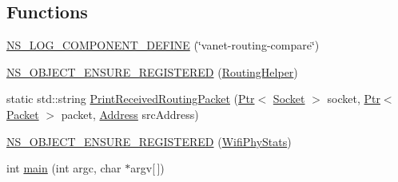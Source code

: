 \subsection*{Functions}
\begin{DoxyCompactItemize}
\item 
\hyperlink{vanet-routing-compare_8cc_a331e56b555a0c205f8ec88c30d22e6f0}{N\+S\+\_\+\+L\+O\+G\+\_\+\+C\+O\+M\+P\+O\+N\+E\+N\+T\+\_\+\+D\+E\+F\+I\+NE} (\char`\"{}vanet-\/routing-\/compare\char`\"{})
\item 
\hyperlink{vanet-routing-compare_8cc_adccadd8d23d7d66d9500068ee1af83c2}{N\+S\+\_\+\+O\+B\+J\+E\+C\+T\+\_\+\+E\+N\+S\+U\+R\+E\+\_\+\+R\+E\+G\+I\+S\+T\+E\+R\+ED} (\hyperlink{classRoutingHelper}{Routing\+Helper})
\item 
static std\+::string \hyperlink{vanet-routing-compare_8cc_a761b3bef7429c44005a316ca3909e0b4}{Print\+Received\+Routing\+Packet} (\hyperlink{classns3_1_1Ptr}{Ptr}$<$ \hyperlink{classns3_1_1Socket}{Socket} $>$ socket, \hyperlink{classns3_1_1Ptr}{Ptr}$<$ \hyperlink{classns3_1_1Packet}{Packet} $>$ packet, \hyperlink{classns3_1_1Address}{Address} src\+Address)
\item 
\hyperlink{vanet-routing-compare_8cc_aca697e06813180072fcf341776559228}{N\+S\+\_\+\+O\+B\+J\+E\+C\+T\+\_\+\+E\+N\+S\+U\+R\+E\+\_\+\+R\+E\+G\+I\+S\+T\+E\+R\+ED} (\hyperlink{classWifiPhyStats}{Wifi\+Phy\+Stats})
\item 
int \hyperlink{vanet-routing-compare_8cc_a0ddf1224851353fc92bfbff6f499fa97}{main} (int argc, char $\ast$argv\mbox{[}$\,$\mbox{]})
\end{DoxyCompactItemize}
